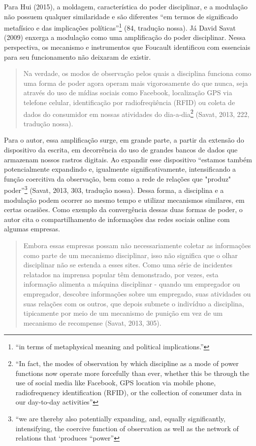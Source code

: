 Para Hui (2015), a moldagem, característica do poder disciplinar, e a modulação não
possuem qualquer similaridade e são diferentes ``em termos de
significado metafísico e das implicações políticas''\footnote{``in terms
  of metaphysical meaning and political implications.''} (84, tradução
nossa). Já David Savat (2009) enxerga a modulação como uma amplificação do poder disciplinar. Nessa
perspectiva, os mecanismo e instrumentos que Foucault identificou com
essenciais para seu funcionamento não deixaram de existir.

\begin{quote}
Na verdade, os modos de observação pelos quais a disciplina funciona
como uma forma de poder agora operam mais vigorosamente do que nunca,
seja através do uso de mídias sociais como Facebook, localização GPS via
telefone celular, identificação por radiofreqüência (RFID) ou coleta de
dados do consumidor em nossas atividades do dia-a-dia\footnote{``In
  fact, the modes of observation by which discipline as a mode of power
  functions now operate more forcefully than ever, whether this be
  through the use of social media like Facebook, GPS location via mobile
  phone, radiofrequency identification (RFID), or the collection of
  consumer data in our day-to-day activities''}
(Savat, 2013, 222, tradução nossa).
\end{quote}

Para o autor, essa amplificação surge, em grande parte, a partir da
extensão do dispositivo da escrita, em decorrência do uso de grandes
bancos de dados que armazenam nossos rastros digitais. Ao expandir esse
dispositivo ``estamos também potencialmente expandindo e, igualmente
significativamente, intensificando a função coercitiva da observação,
bem como a rede de relações que "produz" poder''\footnote{``we are
  thereby also potentially expanding, and, equally significantly,
  intensifying, the coercive function of observation as well as the
  network of relations that `produces ``power''}
(Savat, 2013, 303, tradução nossa).
Dessa forma, a disciplina e a modulação podem ocorrer ao mesmo tempo e
utilizar mecanismos similares, em certas ocasiões. Como exemplo da
convergência dessas duas formas de poder, o autor cita o
compartilhamento de informações das redes sociais online com algumas
empresas.

\begin{quote}
Embora essas empresas possam não necessariamente coletar as informações
como parte de um mecanismo disciplinar, isso não significa que o olhar
disciplinar não se estenda a esses sites. Como uma série de incidentes
relatados na imprensa popular têm demonstrado, por vezes, esta
informação alimenta a máquina disciplinar - quando um empregador ou
empregador, descobre informações sobre um empregado, suas atividades ou
suas relações com os outros, que depois submete o indivíduo a
disciplina, tipicamente por meio de um mecanismo de punição em vez de um
mecanismo de recompense
(Savat, 2013, 305).
\end{quote}

